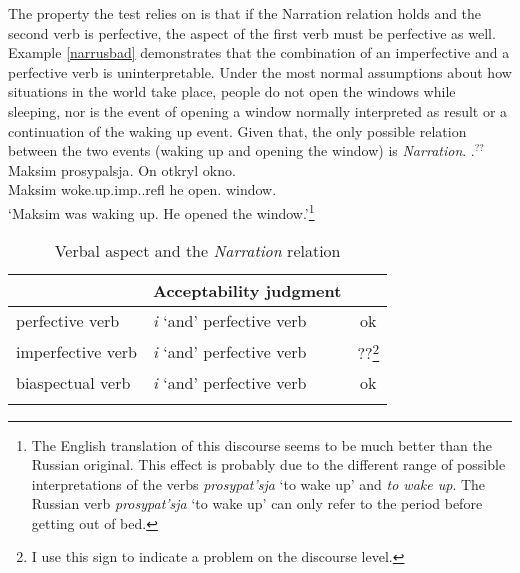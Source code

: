 The property the test relies on is that if the Narration relation holds and the second verb is perfective, the aspect of the first verb must be perfective as well. Example \ref{narrusbad} demonstrates that the combination of an imperfective and a perfective verb is uninterpretable. Under the most normal assumptions about how situations in the world take place, people do not open the windows while sleeping, nor is the event of opening a window normally interpreted as result or a continuation of the waking up event. Given that, the only possible relation between the two events (waking up and opening the window) is \textit{Narration}.
\exg.\label{narrusbad}$^{??}$Maksim prosypalsja\textsuperscript{\IPF}. On otkryl\textsuperscript{\PF} okno.\\
Maksim woke.up.imp..refl he open. window.\\
\trans{}`Maksim was waking up. He opened the window.'\footnote{The English translation of this discourse seems to be much better than the Russian original. This effect is probably due to the different range of possible interpretations of the verbs \textit{prosypat'sja} `to wake up' and \textit{to wake up}. The Russian verb \textit{prosypat'sja} `to wake up' can only refer to the period before getting out of bed.}

\begin{table}
\caption{\label{table}Verbal aspect and the \textit{Narration} relation}
\begin{tabular}{llc}
\lsptoprule
\multicolumn{2}{c}{Verbal combination}& Acceptability judgment\\\midrule
perfective verb & \textit{i} `and' perfective verb~ & ok\hphantom{\textsuperscript{\textit{a}}}\\
imperfective verb & \textit{i} `and' perfective verb~ & ??\footnote{I use this sign to indicate a problem on the discourse level.}\\
biaspectual verb & \textit{i} `and' perfective verb~ & ok\hphantom{\textsuperscript{\textit{a}}}\\
\lspbottomrule
\end{tabular}
\end{table}

